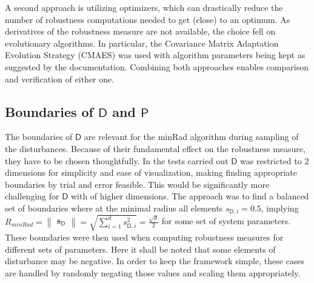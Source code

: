    A second approach is utilizing optimizers, which can drastically reduce the number of robustness computations needed to get (close) to an optimum. As derivatives of the robustness measure are not available, the choice fell on evolutionary algorithms. In particular, the Covariance Matrix Adaptation Evolution Strategy (CMAES) was used with algorithm parameters being kept as suggested by the documentation. Combining both approaches enables comparison and verification of either one. 





\subsection{Boundaries of $\mathsf{D}$ and $\mathsf{P}$ } \label{bounds}

    The boundaries of $\mathsf{D}$ are relevant for the minRad algorithm during sampling of the disturbances. Because of their fundamental effect on the robustness measure, they have to be chosen thoughtfully. In the tests carried out $\mathsf{D}$ was restricted to 2 dimensions for simplicity and ease of visualization, making finding appropriate boundaries by trial and error feasible. This would be significantly more challenging for $\mathsf{D}$ with of higher dimensions. The approach was to find a balanced set of boundaries where at the minimal radius all elements $s_{\mathsf{D},i} = 0.5$, implying $R_{minRad} = \begin{Vmatrix}\mathbf{s}_{\mathsf{D}}\end{Vmatrix}= \sqrt{\sum_{i=1}^{d} s_{\mathsf{D},i}^2} = \frac{\sqrt{d}}{2}$ for some set of system parameters. These boundaries were then used when computing robustness measures for different sets of parameters. 
    Here it shall be noted that some elements of disturbance may be negative. In order to keep the framework simple, these cases are handled by randomly negating those values and scaling them appropriately. 

